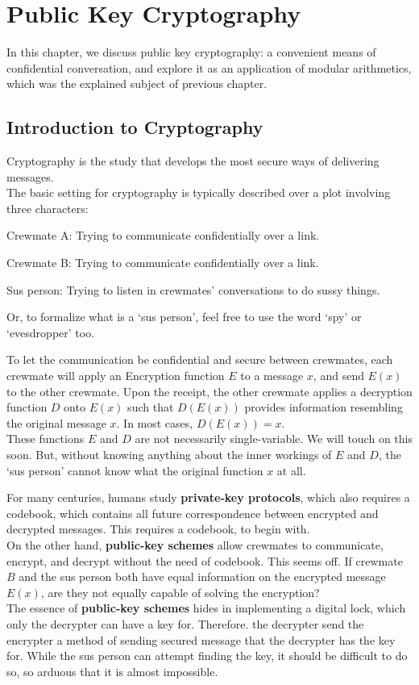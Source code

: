\chapter{Public Key Cryptography}
In this chapter, we discuss public key cryptography: a convenient means of confidential conversation, and explore it as an application of modular arithmetics, which was the explained subject of previous chapter.

\section{Introduction to Cryptography}
Cryptography is the study that develops the most secure ways of delivering messages. \\
The basic setting for cryptography is typically described over a plot involving three characters:
\begin{bindenum}
    \item Crewmate A: Trying to communicate confidentially over a link.
    \item Crewmate B: Trying to communicate confidentially over a link.
    \item Sus person: Trying to listen in crewmates' conversations to do sussy things.
\end{bindenum}
Or, to formalize what is a `sus person', feel free to use the word `spy' or `evesdropper' too.

To let the communication be confidential and secure between crewmates, each crewmate will apply an Encryption function $E$ to a message $x$, and send $E(x)$ to the other crewmate.
Upon the receipt, the other crewmate applies a decryption function $D$ onto $E(x)$ such that $D(E(x))$ provides information resembling the original message $x$. In most cases, $D(E(x)) = x$. \\
These functions $E$ and $D$ are not necessarily single-variable. We will touch on this soon. But, without knowing anything about the inner workings of $E$ and $D$, the `sus person' cannot know what the original function $x$ at all.

For many centuries, humans study \textbf{private-key protocols}, which also requires a codebook, which contains all future correspondence between encrypted and decrypted messages. This requires a codebook, to begin with. \\
On the other hand, \textbf{public-key schemes} allow crewmates to communicate, encrypt, and decrypt without the need of codebook. This seems off. If crewmate $B$ and the sus person both have equal information on the encrypted message $E(x)$, are they not equally capable of solving the encryption? \\
The essence of \textbf{public-key schemes} hides in implementing a digital lock, which only the decrypter can have a key for. Therefore. the decrypter send the encrypter a method of sending secured message that the decrypter has the key for. While the sus person can attempt finding the key, it should be difficult to do so, so arduous that it is almost impossible.

